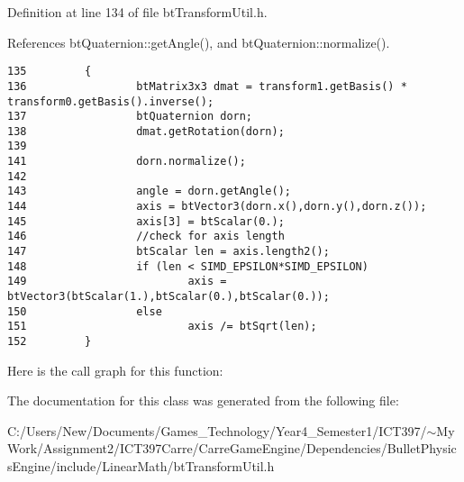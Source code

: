 Definition at line 134 of file btTransformUtil.h.

References btQuaternion::getAngle(), and btQuaternion::normalize().

\begin{Code}\begin{verbatim}135         {
136                 btMatrix3x3 dmat = transform1.getBasis() * transform0.getBasis().inverse();
137                 btQuaternion dorn;
138                 dmat.getRotation(dorn);
139 
141                 dorn.normalize();
142                 
143                 angle = dorn.getAngle();
144                 axis = btVector3(dorn.x(),dorn.y(),dorn.z());
145                 axis[3] = btScalar(0.);
146                 //check for axis length
147                 btScalar len = axis.length2();
148                 if (len < SIMD_EPSILON*SIMD_EPSILON)
149                         axis = btVector3(btScalar(1.),btScalar(0.),btScalar(0.));
150                 else
151                         axis /= btSqrt(len);
152         }
\end{verbatim}
\end{Code}




Here is the call graph for this function:

The documentation for this class was generated from the following file:\begin{CompactItemize}
\item 
C:/Users/New/Documents/Games\_\-Technology/Year4\_\-Semester1/ICT397/$\sim$My Work/Assignment2/ICT397Carre/CarreGameEngine/Dependencies/BulletPhysicsEngine/include/LinearMath/btTransformUtil.h\end{CompactItemize}
